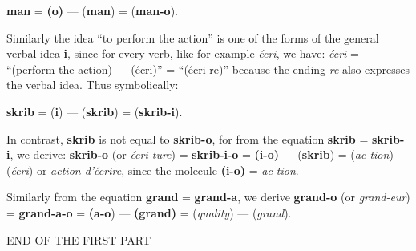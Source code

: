 \begin{sloppypar}
{\begin{minipage}[t]{\linewidth}
{{        \begin{center}
          \textbf{man} = \textbf{(o)} — (\textbf{man}) =
          (\textbf{man-o}).
        \end{center}
        
        Similarly the idea ``to perform the action'' is one of the
        forms of the general verbal idea \textbf{i}, since for every
        verb, like for example \emph{écri}, we have: \emph{écri} =
        ``(perform the action) --- (écri)'' = ``(écri-re)'' because
        the ending \emph{re} also expresses the verbal idea. Thus
        symbolically:

        \begin{center}
          \textbf{skrib} = (\textbf{i}) — (\textbf{skrib}) =
          (\textbf{skrib-i}).
        \end{center}

        In contrast, \textbf{skrib} is not equal to \textbf{skrib-o},
        for from the equation \textbf{skrib} = \textbf{skrib-i}, we
        derive: \textbf{skrib-o} (or \emph{écri-ture}) =
        \textbf{skrib-i-o} = \textbf{(i-o)} — (\textbf{skrib}) =
        (\emph{ac-tion}) — (\emph{écri}) or \emph{action d'écrire},
        since the molecule \textbf{(i-o)} = \emph{ac-tion}.

        Similarly from the equation \textbf{grand} = \textbf{grand-a},
        we derive \textbf{grand-o} (or \emph{grand-eur}) =
        \textbf{grand-a-o} = \textbf{(a-o}) — \textbf{(grand)} =
        (\emph{quality}) — (\emph{grand}).  }

    }
  \end{minipage}

      \begin{center}
        END OF THE FIRST PART
      \end{center}
    }




\end{sloppypar}

\restoregeometry
